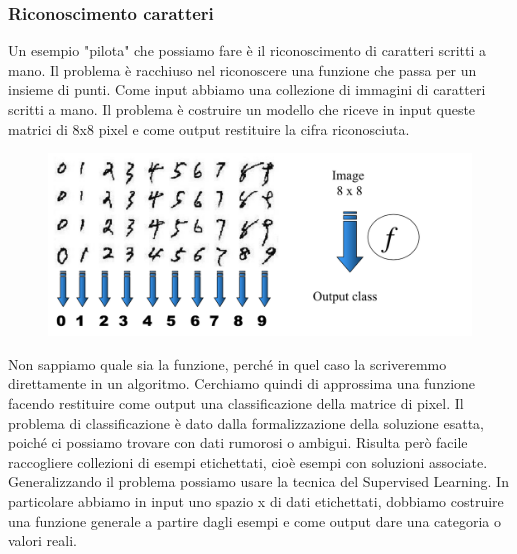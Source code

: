 \documentclass{article}
\begin{document}
\subsubsection{Riconoscimento caratteri}
Un esempio "pilota" che possiamo fare è il riconoscimento di caratteri scritti a mano. Il problema è racchiuso nel riconoscere una funzione che passa per un insieme di punti. Come input abbiamo una collezione di immagini di caratteri scritti a mano. Il problema è costruire un modello che riceve in input queste matrici di 8x8 pixel e come output restituire la cifra riconosciuta.
\begin{figure}[H]
    \centering
    \includegraphics[scale=0.5]{Images/caratteririconoscimento.png}
\end{figure}
Non sappiamo quale sia la funzione, perché in quel caso la scriveremmo direttamente in un algoritmo. Cerchiamo quindi di approssima una funzione facendo restituire come output una classificazione della matrice di pixel. Il problema di classificazione è dato dalla formalizzazione della soluzione esatta, poiché ci possiamo trovare con dati rumorosi o ambigui. Risulta però facile raccogliere collezioni di esempi etichettati, cioè esempi con soluzioni associate. \newline
Generalizzando il problema possiamo usare la tecnica del Supervised Learning. In particolare abbiamo in input uno spazio x di dati etichettati, dobbiamo costruire una funzione generale a partire dagli esempi e come output dare una categoria o valori reali. 
\end{document}
